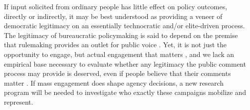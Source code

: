 

If input solicited from ordinary people has little effect on policy outcomes, directly or indirectly, it may be best understood as providing a veneer of democratic legitimacy on an essentially technocratic and/or elite-driven process.
The legitimacy of bureaucratic policymaking is said to depend on the premise that rulemaking provides an outlet for public voice \citep{Croley2003, Rosenbloom2003}. Yet, it is not just the opportunity to engage, but actual engagement that matters \citep{Herz2018}, and we lack an empirical base necessary to evaluate whether any legitimacy the public comment process may provide is deserved, even if people believe that their comments matter \citep{Yackee2014JPART}.
If mass engagement does shape agency decisions, a new research program will be needed to investigate who exactly these campaigns mobilize and represent.

